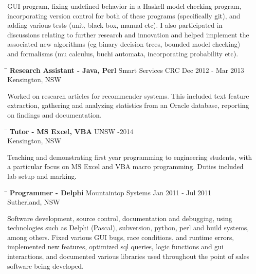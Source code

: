 \documentclass{res}
\begin{document}
\begin{resume}
    GUI program, fixing undefined behavior in a Haskell model checking program,
    incorporating version control for both of these programs (specifically
    git), and adding various tests (unit, black box, manual etc). I also
    participated in discussions relating to further research and innovation and
    helped implement the associated new algorithms (eg binary decision trees,
    bounded model checking) and formalisms (mu calculus, buchi automata,
    incorporating probability etc).
   \begin{tabbing}
   \hspace{2.3in}\= \hspace{2.6in}\= \kill %
    {\bf Research Assistant - Java, Perl} \>Smart Services CRC \>Dec 2012 - Mar 2013\\
                                          \>Kensington, NSW
   \end{tabbing}\vspace{-20pt}      %
    Worked on research articles for recommender systems. This included text
    feature extraction, gathering and analyzing statistics from an Oracle
    database, reporting on findings and documentation.
   \begin{tabbing}
   \hspace{2.3in}\= \hspace{2.6in}\= \kill %
    {\bf Tutor - MS Excel, VBA} \>UNSW     -2014\\
                                \>Kensington, NSW
   \end{tabbing}\vspace{-20pt}      %
    Teaching and demonstrating first year programming to engineering students,
    with a particular focus on MS Excel and VBA macro programming. Duties
    included lab setup and marking.
   \begin{tabbing}
   \hspace{2.3in}\= \hspace{2.6in}\= \kill %
    {\bf Programmer - Delphi} \>Mountaintop Systems \> Jan 2011 - Jul 2011\\
                              \>Sutherland, NSW
   \end{tabbing}\vspace{-20pt}
    Software development, source control, documentation and debugging,
    using technologies such as Delphi (Pascal), subversion, python, perl and
    build systems, among others. Fixed various GUI bugs, race conditions, and
    runtime errors, implemented new features, optimized sql queries, logic
    functions and gui interactions, and documented various libraries used
    throughout the point of sales software being developed.



\end{resume}
\end{document}
